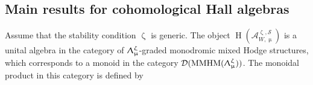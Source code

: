 \documentclass[a4paper,10pt]{amsart}
\renewcommand{\zeta}{\upzeta}
\renewcommand{\Lambda}{\Uplambda}
\renewcommand{\mu}{\upmu}
\DeclareMathOperator{\Pf}{\mathfrak{P}}
\newcommand{\SP}{\mathcal{S}}
\newcommand{\Msp}{\mathcal{M}}
\DeclareMathOperator{\sst}{-ss}
\DeclareMathOperator{\MMHM}{MMHM}
\DeclareMathOperator{\Gr}{Gr}
\DeclareMathOperator{\Ho}{\mathcal{H}}
\DeclareMathOperator{\HO}{H}
\newcommand{\Dub}{\mathcal{D}}
\begin{document}
\subsection{Main results for cohomological Hall algebras}
Assume that the stability condition $\zeta$ is generic.  The object $\HO(\mathcal{A}^{\zeta,\SP}_{W,\mu})$ is a unital algebra in the category of $\Lambda_{\mu}^{\zeta}$-graded monodromic mixed Hodge structures, which corresponds to a monoid in the category $\Dub(\MMHM(\Lambda_{\mu}^{\zeta}))$.  The monoidal product in this category is defined by 
\end{document}
